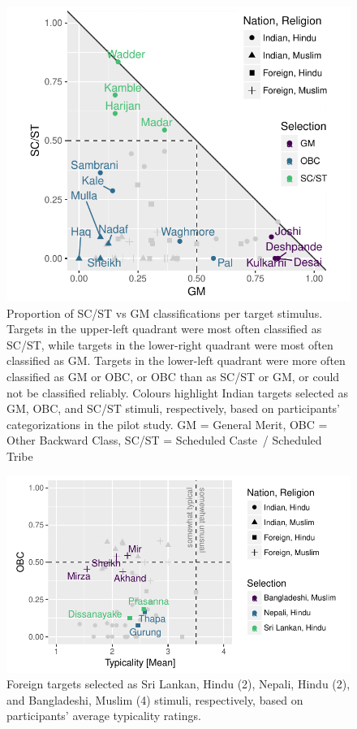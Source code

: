 \documentclass[12pt, a4paper]{article}
\begin{document}
\begin{figure}
\centering
\includegraphics[scale=1]{../figures/appendices/appendices-a-1}
\caption[Proportion of SC/ST vs GM classifications per target stimulus (Pilot study)]{Proportion of SC/ST vs GM classifications per target stimulus. Targets in the upper-left quadrant were most often classified as SC/ST, while targets in the lower-right quadrant were most often classified as GM. Targets in the lower-left quadrant were more often classified as GM or OBC, or OBC than as SC/ST or GM, or could not be classified reliably. Colours highlight Indian targets selected as GM, OBC, and SC/ST stimuli, respectively, based on participants' categorizations in the pilot study. GM = General Merit, OBC = Other Backward Class, SC/ST = Scheduled Caste~/ Scheduled Tribe}
\label{fig:d-1}
\end{figure}

\begin{figure}
\centering
\includegraphics[scale=1]{../figures/appendices/appendices-a-2}
\caption[Foreign targets selected based on participants' average typicality ratings (Pilot study)]{Foreign targets selected as Sri Lankan, Hindu (2), Nepali, Hindu (2), and Bangladeshi, Muslim (4) stimuli, respectively, based on participants' average typicality ratings.}
\label{fig:d-2}
\end{figure}
\end{document}
